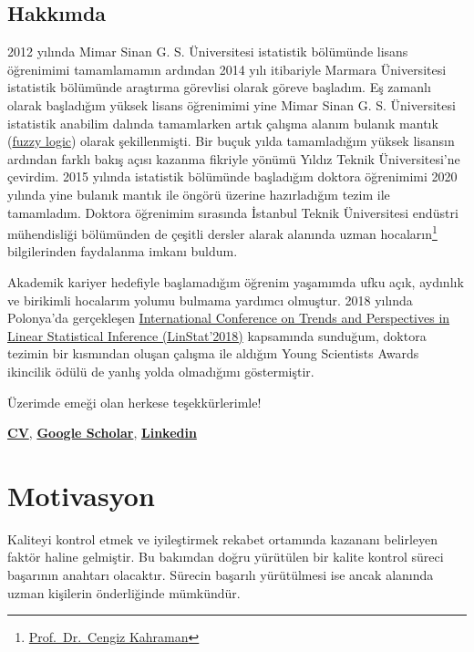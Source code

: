 \documentclass[
]{book}
\begin{document}
\hypertarget{hakkux131mda}{%
\section{Hakkımda}\label{hakkux131mda}}

2012 yılında Mimar Sinan G. S. Üniversitesi istatistik bölümünde lisans öğrenimimi tamamlamamın ardından 2014 yılı itibariyle Marmara Üniversitesi istatistik bölümünde araştırma görevlisi olarak göreve başladım. Eş zamanlı olarak başladığım yüksek lisans öğrenimimi yine Mimar Sinan G. S. Üniversitesi istatistik anabilim dalında tamamlarken artık çalışma alanım bulanık mantık (\href{https://en.wikipedia.org/wiki/Fuzzy_logic}{fuzzy logic}) olarak şekillenmişti. Bir buçuk yılda tamamladığım yüksek lisansın ardından farklı bakış açısı kazanma fikriyle yönümü Yıldız Teknik Üniversitesi'ne çevirdim. 2015 yılında istatistik bölümünde başladığım doktora öğrenimimi 2020 yılında yine bulanık mantık ile öngörü üzerine hazırladığım tezim ile tamamladım. Doktora öğrenimim sırasında İstanbul Teknik Üniversitesi endüstri mühendisliği bölümünden de çeşitli dersler alarak alanında uzman hocaların\footnote{\href{http://akademi.itu.edu.tr/kahramanc/}{Prof.~Dr.~Cengiz Kahraman}} bilgilerinden faydalanma imkanı buldum.

Akademik kariyer hedefiyle başlamadığım öğrenim yaşamımda ufku açık, aydınlık ve birikimli hocalarım yolumu bulmama yardımcı olmuştur. 2018 yılında Polonya'da gerçekleşen \href{http://www.linstat2018.put.poznan.pl/ysa.html}{International Conference on Trends and Perspectives in Linear Statistical Inference (LinStat'2018)} kapsamında sunduğum, doktora tezimin bir kısmından oluşan çalışma ile aldığım Young Scientists Awards ikincilik ödülü de yanlış yolda olmadığımı göstermiştir.

Üzerimde emeği olan herkese teşekkürlerimle!

\href{https://avesis.marmara.edu.tr/busenur.sarica}{\textbf{CV}}, \href{https://scholar.google.com.tr/citations?user=OKlYJEgAAAAJ\&hl=tr}{\textbf{Google Scholar}}, \href{https://www.linkedin.com/in/busenur-kızılaslan-795ab54a}{\textbf{Linkedin}}

\hypertarget{motivasyon}{%
\chapter{Motivasyon}\label{motivasyon}}

Kaliteyi kontrol etmek ve iyileştirmek rekabet ortamında kazananı belirleyen faktör haline gelmiştir. Bu bakımdan doğru yürütülen bir kalite kontrol süreci başarının anahtarı olacaktır. Sürecin başarılı yürütülmesi ise ancak alanında uzman kişilerin önderliğinde mümkündür.
\end{document}
